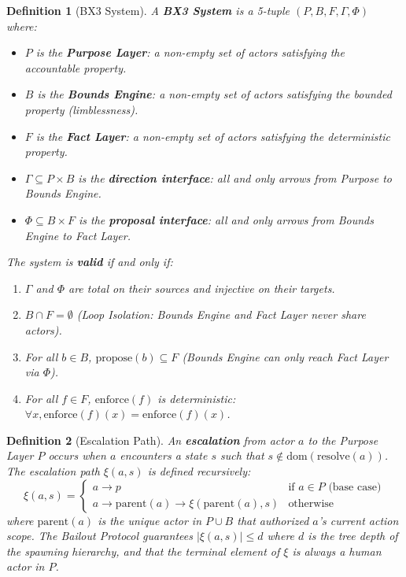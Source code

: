 \documentclass[12pt]{article}
\theoremstyle{plain}
\newtheorem{defin}{Definition}[section]
\begin{document}
\begin{defin}[BX3 System]\label{def:bx3-system}
A \textbf{BX3 System} is a 5-tuple $(P, B, F, \Gamma, \Phi)$ where:
\begin{itemize}[noitemsep]
    \item $P$ is the \textbf{Purpose Layer}: a non-empty set of actors satisfying the \textit{accountable} property.
    \item $B$ is the \textbf{Bounds Engine}: a non-empty set of actors satisfying the \textit{bounded} property (limblessness).
    \item $F$ is the \textbf{Fact Layer}: a non-empty set of actors satisfying the \textit{deterministic} property.
    \item $\Gamma \subseteq P \times B$ is the \textbf{direction interface}: all and only arrows from Purpose to Bounds Engine.
    \item $\Phi \subseteq B \times F$ is the \textbf{proposal interface}: all and only arrows from Bounds Engine to Fact Layer.
\end{itemize}
The system is \textbf{valid} if and only if:
\begin{enumerate}[noitemsep]
    \item $\Gamma$ and $\Phi$ are total on their sources and injective on their targets.
    \item $B \cap F = \emptyset$ (Loop Isolation: Bounds Engine and Fact Layer never share actors).
    \item For all $b \in B$, $\text{propose}(b) \subseteq F$ (Bounds Engine can only reach Fact Layer via $\Phi$).
    \item For all $f \in F$, $\text{enforce}(f)$ is deterministic: $\forall x, \text{enforce}(f)(x) = \text{enforce}(f)(x)$.
\end{enumerate}
\end{defin}

\begin{defin}[Escalation Path]\label{def:escalation}
An \textbf{escalation} from actor $a$ to the Purpose Layer $P$ occurs when $a$ encounters a state $s$ such that $s \notin \text{dom}(\text{resolve}(a))$. The escalation path $\xi(a, s)$ is defined recursively:
\[
\xi(a, s) = 
\begin{cases}
a \rightarrow p & \text{if } a \in P \text{ (base case)} \\
a \rightarrow \text{parent}(a) \rightarrow \xi(\text{parent}(a), s) & \text{otherwise}
\end{cases}
\]
where $\text{parent}(a)$ is the unique actor in $P \cup B$ that authorized $a$'s current action scope. The Bailout Protocol guarantees $|\xi(a, s)| \leq d$ where $d$ is the tree depth of the spawning hierarchy, and that the terminal element of $\xi$ is always a human actor in $P$.
\end{defin}
\end{document}
